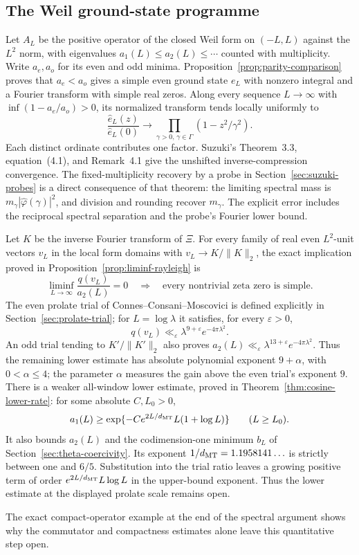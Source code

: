 \subsection{The Weil ground-state programme}
Let $A_L$ be the positive operator of the closed Weil form on
$(-L,L)$ against the $L^2$ norm, with eigenvalues
$a_1(L)\le a_2(L)\le\cdots$ counted with multiplicity.
Write $a_e,a_o$ for its even and odd minima.
Proposition~\ref{prop:parity-comparison} proves that
$a_e<a_o$ gives a simple even ground state $e_L$ with nonzero
integral and a Fourier transform with simple real zeros. Along
every sequence $L\to\infty$ with
$\inf(1-a_e/a_o)>0$, its normalized transform tends locally
uniformly to
\[
 \frac{\widehat e_L(z)}{\widehat e_L(0)}
       \longrightarrow\prod_{\gamma>0,\,\gamma\in\Gamma}
                         (1-z^2/\gamma^2).
\]
Each distinct ordinate contributes one factor. Suzuki's
Theorem~3.3, equation~(4.1), and Remark~4.1
\cite[pp.~10--12]{suzuki} give the unshifted inverse-compression
convergence. The fixed-multiplicity recovery by a probe in
Section~\ref{sec:suzuki-probes} is a direct consequence of that
theorem: the limiting spectral mass is
$m_\gamma|\widehat\varphi(\gamma)|^2$, and division and rounding
recover $m_\gamma$. The explicit error includes the reciprocal
spectral separation and the probe's Fourier lower bound.

Let $K$ be the inverse Fourier transform of $\Xi$.
For every family of real even $L^2$-unit vectors $v_L$ in the
local form domains with $v_L\to K/\|K\|_2$, the exact implication
proved in Proposition~\ref{prop:liminf-rayleigh} is
\[
 \liminf_{L\to\infty}\frac{q(v_L)}{a_2(L)}=0
       \quad\Longrightarrow\quad
       \text{every nontrivial zeta zero is simple}.
\]
The even prolate trial of Connes--Consani--Moscovici is defined
explicitly in Section~\ref{sec:prolate-trial}; for $L=\log\lambda$
it satisfies, for every $\varepsilon>0$,
\[
 q(v_L)\ll_\varepsilon\lambda^{9+\varepsilon}e^{-4\pi\lambda^2}.
\]
An odd trial tending to $K'/\|K'\|_2$ also proves
$a_2(L)\ll_\varepsilon\lambda^{13+\varepsilon}e^{-4\pi\lambda^2}$.
Thus the remaining lower estimate has absolute polynomial exponent
$9+\alpha$, with $0<\alpha\le4$; the parameter $\alpha$ measures
the gain above the even trial's exponent $9$.
There is a weaker all-window lower estimate, proved in
Theorem~\ref{thm:cosine-lower-rate}: for some absolute \(C,L_0>0\),
\[
 a_1(L)\ge\exp\{-C e^{2L/d_{\rm MT}}L(1+\log L)\}
                 \qquad(L\ge L_0).
\]
It also bounds \(a_2(L)\) and the codimension-one minimum \(b_L\)
of Section~\ref{sec:theta-coercivity}. Its exponent
\(1/d_{\rm MT}=1.1958141\ldots\) is strictly between one and \(6/5\).
Substitution into the trial ratio leaves a growing positive term of
order \(e^{2L/d_{\rm MT}}L\log L\) in the upper-bound exponent.
Thus the lower estimate at the displayed prolate scale remains open.

The exact compact-operator example at the end of the spectral
argument shows why the commutator and compactness estimates alone
leave this quantitative step open.
